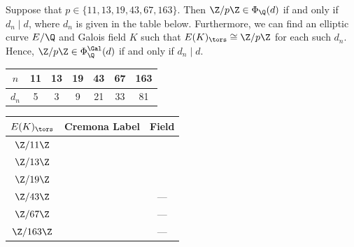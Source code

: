 \begin{frame}[plain]
\footnotesize
\begin{lem}
Suppose that $p \in \{ 11, 13, 19, 43, 67, 163 \}$. Then $\Z/p\Z \in \Phi_\Q(d)$ if and only if $d_n \mid d$, where $d_n$ is given in the table below. Furthermore, we can find an elliptic curve $E/\Q$ and Galois field $K$ such that $E(K)_\tors \cong \Z/p\Z$ for each such $d_n$. Hence, $\Z/p\Z \in \Phi_\Q^{\Gal}(d)$ if and only if $d_n \mid d$.
	\begin{table}[!ht]
	\centering
	\begin{tabular}{|c||cccccc|} \hline
	$n$ & 11 & 13 & 19 & 43 & 67 & 163 \\ \hline
	$d_n$ & 5 & 3 & 9 & 21 & 33 & 81 \\ \hline
	\end{tabular}
	\end{table}
\end{lem}

	\begin{table}[!ht]
	\centering
	\begin{tabular}{ccc} \hline
	$E(K)_\tors$ & Cremona Label & Field \\ \hline
	$\Z/11\Z$ & \otoco{} & \qzetaeep{} \\
	$\Z/13\Z$ & \ofsbo{} & \qzetasp{} \\
	$\Z/19\Z$ & \tsoao{} & \qzetantp{} \\
	$\Z/43\Z$ & \oefnao{} & --- \\
	$\Z/67\Z$ & \ffenao{} & --- \\
	$\Z/163\Z$ & \tsfsnao{} & ---
	\end{tabular}
	\end{table}
\end{frame}





